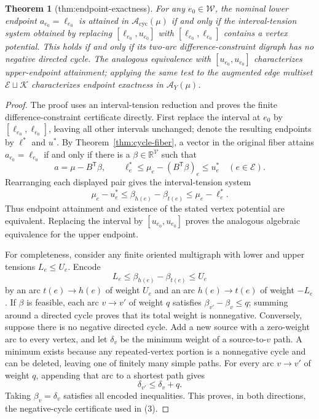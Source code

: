 \documentclass{article}
\newtheorem{theorem}{Theorem}
\begin{document}
\begin{theorem}[thm:endpoint-exactness]\label{thm:endpoint-exactness}
For any \(e_0\in\mathcal W\), the nominal lower endpoint \(a_{e_0}=\ell_{e_0}\) is attained in \(\mathcal A_{\mathrm{cyc}}(\mu)\) if and only if the interval-tension system obtained by replacing \([\ell_{e_0},u_{e_0}]\) with \([\ell_{e_0},\ell_{e_0}]\) contains a vertex potential. This holds if and only if its two-arc difference-constraint digraph has no negative directed cycle. The analogous equivalence with \([u_{e_0},u_{e_0}]\) characterizes upper-endpoint attainment; applying the same test to the augmented edge multiset \(\mathcal E\sqcup\mathcal K\) characterizes endpoint exactness in \(\mathcal A_Y(\mu)\).
\end{theorem}
\begin{proof}
The proof uses an interval-tension reduction and proves the finite difference-constraint certificate directly.  First replace the interval at \(e_0\) by \([\ell_{e_0},\ell_{e_0}]\), leaving all other intervals unchanged; denote the resulting endpoints by \(\ell^*\) and \(u^*\).  By Theorem~\ref{thm:cycle-fiber}, a vector in the original fiber attains \(a_{e_0}=\ell_{e_0}\) if and only if there is a \(\beta\in\mathbb R^{\mathcal V}\) such that
\[
 a=\mu-B^{\mathsf T}\beta,
 \qquad
 \ell^*_e\le \mu_e-(B^{\mathsf T}\beta)_e\le u^*_e
 \quad(e\in\mathcal E).
\]
Rearranging each displayed pair gives the interval-tension system
\[
 \mu_e-u^*_e\le \beta_{h(e)}-\beta_{t(e)}
 \le \mu_e-\ell^*_e. \tag{3}
\]
Thus endpoint attainment and existence of the stated vertex potential are equivalent.  Replacing the interval by \([u_{e_0},u_{e_0}]\) proves the analogous algebraic equivalence for the upper endpoint.

For completeness, consider any finite oriented multigraph with lower and upper tensions \(L_e\le U_e\).  Encode
\[
 L_e\le\beta_{h(e)}-\beta_{t(e)}\le U_e
\]
by an arc \(t(e)\to h(e)\) of weight \(U_e\) and an arc \(h(e)\to t(e)\) of weight \(-L_e\).  If \(\beta\) is feasible, each arc \(v\to v'\) of weight \(q\) satisfies \(\beta_{v'}-\beta_v\le q\); summing around a directed cycle proves that its total weight is nonnegative.  Conversely, suppose there is no negative directed cycle.  Add a new source with a zero-weight arc to every vertex, and let \(\delta_v\) be the minimum weight of a source-to-\(v\) path.  A minimum exists because any repeated-vertex portion is a nonnegative cycle and can be deleted, leaving one of finitely many simple paths.  For every arc \(v\to v'\) of weight \(q\), appending that arc to a shortest path gives
\[
 \delta_{v'}\le\delta_v+q.
\]
Taking \(\beta_v=\delta_v\) satisfies all encoded inequalities.  This proves, in both directions, the negative-cycle certificate used in (3).


\end{proof}
\end{document}

